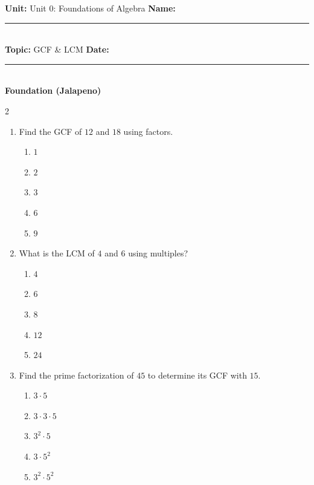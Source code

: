 \documentclass[10pt]{article}
\begin{document}
\enlargethispage{2.5cm}

\begin{tcolorbox}[colback=mainblue!5, colframe=mainblue, sharp corners, boxrule=0.5pt]
    \small \textbf{Unit:} Unit 0: Foundations of Algebra \hfill \textbf{Name:} \rule{3cm}{0.4pt} \\
    \small \textbf{Topic:} GCF & LCM \hfill \textbf{Date:} \rule{2cm}{0.4pt} \\
    \centering \textbf{\large Foundation (Jalapeno)}
\end{tcolorbox}

\vspace{0.2cm}

\begin{multicols}{2}
\begin{enumerate}[label=\textbf{Q\arabic*.}, leftmargin=*, itemsep=6pt, parsep=0pt]

  \item \small Find the GCF of $12$ and $18$ using factors.
  \begin{enumerate}[label=(\Alph*), leftmargin=0.6cm, nosep, itemsep=2pt]
    \item $1$
    \item $2$
    \item $3$
    \item $6$
    \item $9$
  \end{enumerate}

  \item \small What is the LCM of $4$ and $6$ using multiples?
  \begin{enumerate}[label=(\Alph*), leftmargin=0.6cm, nosep, itemsep=2pt]
    \item $4$
    \item $6$
    \item $8$
    \item $12$
    \item $24$
  \end{enumerate}

  \item \small Find the prime factorization of $45$ to determine its GCF with $15$.
  \begin{enumerate}[label=(\Alph*), leftmargin=0.6cm, nosep, itemsep=2pt]
    \item $3 \cdot 5$
    \item $3 \cdot 3 \cdot 5$
    \item $3^2 \cdot 5$
    \item $3 \cdot 5^2$
    \item $3^2 \cdot 5^2$
  \end{enumerate}


\end{enumerate}
\end{multicols}
\end{document}
